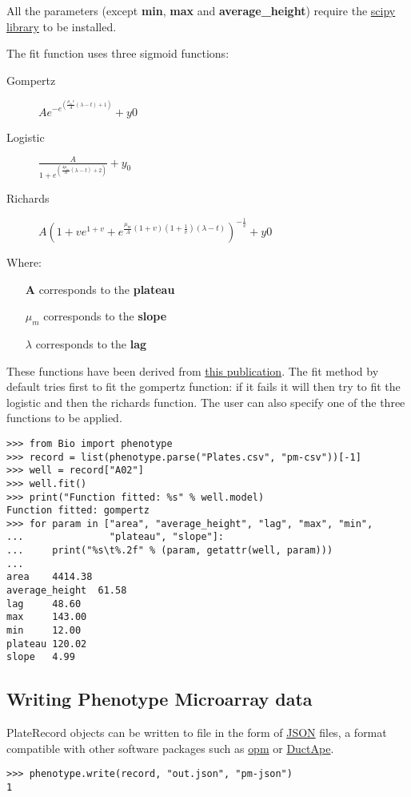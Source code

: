 All the parameters (except \textbf{min}, \textbf{max} and \textbf{average\_height}) require the
\href{http://www.scipy.org/}{scipy library} to be installed.

The fit function uses three sigmoid functions:

\begin{description}
  \item[Gompertz] $Ae^{-e^{(\frac{\mu_{m}e}{A}(\lambda - t) + 1)}} + y0$

  \item[Logistic] $\frac{A}{1+e^{(\frac{4\mu_{m}}{A}(\lambda - t) + 2)}} + y_{0}$

  \item[Richards] $A(1 + ve^{1 + v} + e^{\frac{\mu_{m}}{A}(1 + v)(1 + \frac{1}{v})(\lambda - t)})^{-\frac{1}{v}} + y0$

\end{description}

Where:
\begin{itemize}
  \item[\textbf{A}] corresponds to the \textbf{plateau}

  \item[\textbf{$\mu_{m}$}] corresponds to the \textbf{slope}

  \item[\textbf{$\lambda$}] corresponds to the \textbf{lag}

\end{itemize}

These functions have been derived from \href{http://www.ncbi.nlm.nih.gov/pubmed/16348228}{this publication}.
The fit method by default tries first to fit the gompertz function: if it fails it will then try to fit
the logistic and then the richards function. The user can also specify one of the three functions to be applied.

\begin{verbatim}
>>> from Bio import phenotype
>>> record = list(phenotype.parse("Plates.csv", "pm-csv"))[-1]
>>> well = record["A02"]
>>> well.fit()
>>> print("Function fitted: %s" % well.model)
Function fitted: gompertz
>>> for param in ["area", "average_height", "lag", "max", "min",
...               "plateau", "slope"]:
...     print("%s\t%.2f" % (param, getattr(well, param)))
...
area    4414.38
average_height  61.58
lag     48.60
max     143.00
min     12.00
plateau 120.02
slope   4.99
\end{verbatim}

\subsection{Writing Phenotype Microarray data}
PlateRecord objects can be written to file in the form of
\href{https://en.wikipedia.org/wiki/JSON}{JSON}
files, a format compatible with other software packages such as
\href{https://www.dsmz.de/research/microorganisms/projects/analysis-of-omnilog-phenotype-microarray-data.html}{opm}
or \href{http://combogenomics.github.io/DuctApe/}{DuctApe}.
\begin{verbatim}
>>> phenotype.write(record, "out.json", "pm-json")
1
\end{verbatim}
